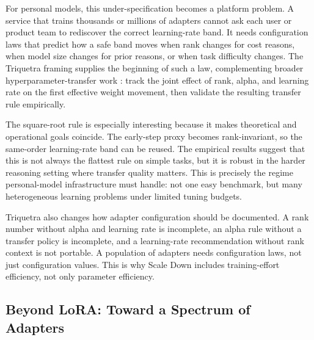 \documentclass{llmxive}
\begin{document}
For personal models, this under-specification becomes a platform problem. A service that trains thousands or millions of adapters cannot ask each user or product team to rediscover the correct learning-rate band. It needs configuration laws that predict how a safe band moves when rank changes for cost reasons, when model size changes for prior reasons, or when task difficulty changes. The Triquetra framing supplies the beginning of such a law, complementing broader hyperparameter-transfer work \citep{yang2022tensorprograms}: track the joint effect of rank, alpha, and learning rate on the first effective weight movement, then validate the resulting transfer rule empirically.

The square-root rule is especially interesting because it makes theoretical and operational goals coincide. The early-step proxy becomes rank-invariant, so the same-order learning-rate band can be reused. The empirical results suggest that this is not always the flattest rule on simple tasks, but it is robust in the harder reasoning setting where transfer quality matters. This is precisely the regime personal-model infrastructure must handle: not one easy benchmark, but many heterogeneous learning problems under limited tuning budgets.

Triquetra also changes how adapter configuration should be documented. A rank number without alpha and learning rate is incomplete, an alpha rule without a transfer policy is incomplete, and a learning-rate recommendation without rank context is not portable. A population of adapters needs configuration laws, not just configuration values. This is why Scale Down includes training-effort efficiency, not only parameter efficiency.





\subsection{Beyond LoRA: Toward a Spectrum of Adapters}\label{subsec:beyond-lora}
\end{document}
